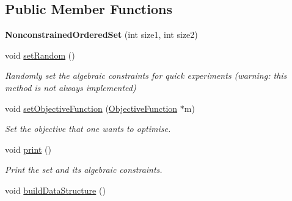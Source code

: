 \subsection*{Public Member Functions}
\begin{DoxyCompactItemize}
\item 
\hypertarget{classNonconstrainedOrderedSet_a6651cd5e2b0993f58ec8b60adf98593d}{{\bfseries Nonconstrained\-Ordered\-Set} (int size1, int size2)}\label{classNonconstrainedOrderedSet_a6651cd5e2b0993f58ec8b60adf98593d}

\item 
\hypertarget{classNonconstrainedOrderedSet_a731b472b246c259509c6bc0175972aca}{void \hyperlink{classNonconstrainedOrderedSet_a731b472b246c259509c6bc0175972aca}{set\-Random} ()}\label{classNonconstrainedOrderedSet_a731b472b246c259509c6bc0175972aca}

\begin{DoxyCompactList}\small\item\em Randomly set the algebraic constraints for quick experiments (warning\-: this method is not always implemented) \end{DoxyCompactList}\item 
void \hyperlink{classNonconstrainedOrderedSet_a67a4a72a5e1bff3d46473757199455d9}{set\-Objective\-Function} (\hyperlink{classObjectiveFunction}{Objective\-Function} $\ast$m)
\begin{DoxyCompactList}\small\item\em Set the objective that one wants to optimise. \end{DoxyCompactList}\item 
\hypertarget{classNonconstrainedOrderedSet_a19a923ee00c1ea0bbf875b2166099b0e}{void \hyperlink{classNonconstrainedOrderedSet_a19a923ee00c1ea0bbf875b2166099b0e}{print} ()}\label{classNonconstrainedOrderedSet_a19a923ee00c1ea0bbf875b2166099b0e}

\begin{DoxyCompactList}\small\item\em Print the set and its algebraic constraints. \end{DoxyCompactList}\item 
\hypertarget{classNonconstrainedOrderedSet_a53251872f1e632d770c971ca74552533}{void \hyperlink{classNonconstrainedOrderedSet_a53251872f1e632d770c971ca74552533}{build\-Data\-Structure} ()}\label{classNonconstrainedOrderedSet_a53251872f1e632d770c971ca74552533}


\end{DoxyCompactItemize}
